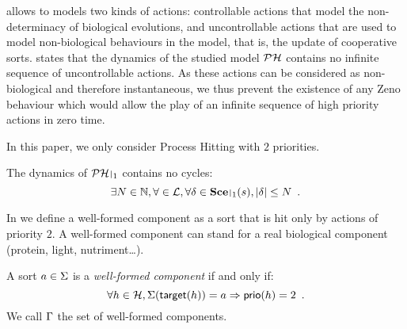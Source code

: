  allows to models two kinds of actions: controllable actions that model the non-determinacy of biological evolutions,
and uncontrollable actions that are used to model non-biological behaviours in the model, that is, the update of cooperative sorts.
 states that the dynamics of the studied model $\mathcal{PH}$ contains no infinite sequence of uncontrollable actions.
As these actions can be considered as non-biological and therefore instantaneous, we thus prevent the existence of any Zeno behaviour
which would allow the play of an infinite sequence of high priority actions in zero time.
\begin{criterion}[2 priorities]
\label{cr:2prio}
  In this paper, we only consider Process Hitting with $2$ priorities.
\end{criterion}
%
\begin{criterion}
\label{cr:bounded}
  The dynamics of $\restriction{\PH}{1}$ contains no cycles:
  $$\exists N \in \sN, \forall \in \PHl, \forall \delta \in \restriction{\Sce}{1}(s), |\delta| \leq N \enspace.$$
\end{criterion}

In  we define a well-formed component as a sort that is hit only by actions of priority $2$.
A well-formed component can stand for a real biological component (protein, light, nutriment…).
\begin{definition}
\label{def:component}
  A sort $a \in \Sigma$ is a \emph{well-formed component} if and only if:
  $$\forall h \in \mathcal{H}, \Sigma(\mathsf{target}(h)) = a \Rightarrow \mathsf{prio}(h) = 2 \enspace.$$
  We call $\Gamma$ the set of well-formed components.
\end{definition}

